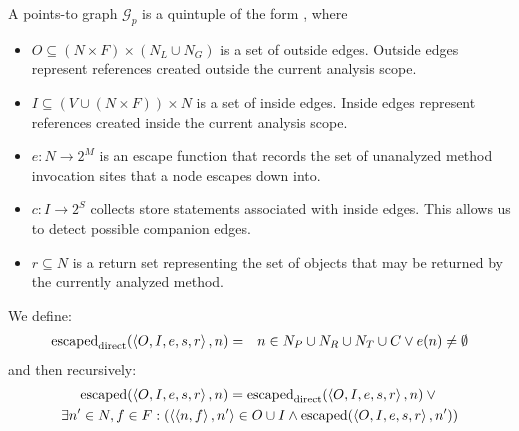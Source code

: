 \documentclass[11pt,notitlepage]{article}
\begin{document}
A points-to graph $\mathcal{G}_p$ is a quintuple of the form , where
\begin{itemize}
\item $O \subseteq (N\times F)\times(N_L \cup N_G)$ is a set of
outside edges.  Outside edges represent references created outside the
current analysis scope.
\item $I \subseteq (V\cup(N\times F))\times N$ is a set of inside
edges.  Inside edges represent references created inside the current
analysis scope.
\item $e:N\to 2^M$ is an escape function that records the set of
unanalyzed method invocation sites that a node escapes down into.
\item $c:I\to 2^S$ collects store statements associated with
inside edges.  This allows us to detect possible companion edges.
\item $r \subseteq N$ is a return set representing the set of objects
that may be returned by the currently analyzed method.
\end{itemize}
We define:
\begin{eqnarray*}
\text{escaped}_\text{direct}(\left\langle O,I,e,s,r \right\rangle, n) &=&
 n\in N_P \cup N_R \cup N_T \cup C
 \vee
 e(n)\neq\emptyset
\end{eqnarray*}
and then recursively:
\begin{multline*}
\text{escaped}%
              (\tuple{O,I,e,s,r},n) =
 \text{escaped}_\text{direct}(\tuple{O,I,e,s,r},n) \vee {}
\\
 \exists n'\in N,f\in F : \left(\tuple{\tuple{n,f},n'}\in O\cup I
 \wedge
 \text{escaped}%
               (\tuple{O,I,e,s,r},n')\right)
\end{multline*}
\end{document}
